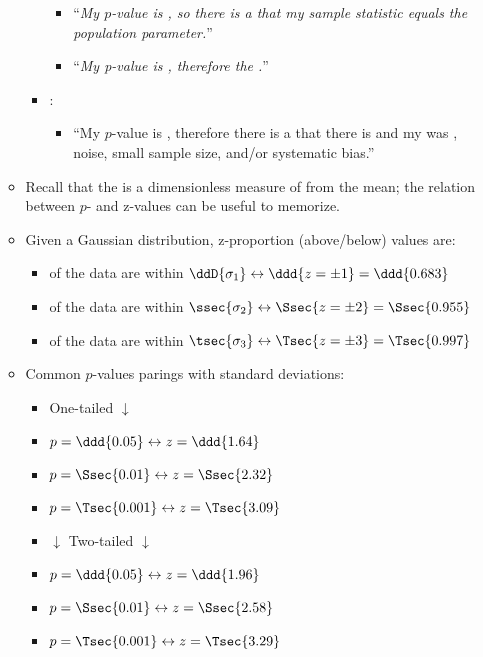 \begin{itemize}
\begin{itemize}
\begin{itemize}
\begin{itemize}
            \item ``\textit{My \(p\)-value is , so there is a  that my sample statistic equals the population parameter.}''
            \item ``\textit{My p-value is , therefore the .}''
          \end{itemize}
        \item {}: 
        \begin{itemize}
          \item ``My \(p\)-value is , therefore there is a  that there is  and my  was , noise, small sample size, and/or systematic bias.''
        \end{itemize}
      \end{itemize}
    \item Recall that the \hyperref[Subsection: Z-Score Standardization]{} is a dimensionless measure of \hyperref[Subsection: Measures of Dispersion]{} from the mean; the relation between \(p\)- and z-values can be useful to memorize.
    \item Given a Gaussian distribution, z-proportion (above/below) values are:
      \begin{itemize}
        \item {} of the data are within \(\ddD{\sigma_1}\leftrightarrow \ddd{z = \pm 1}= \ddd{0.683}\) 
        \item {} of the data are within \(\ssec{\sigma_2}\leftrightarrow \Ssec{z = \pm 2} = \Ssec{0.955}\)
        \item {} of the data are within \(\tsec{\sigma_3}\leftrightarrow \Tsec{z = \pm 3} = \Tsec{0.997}\)
      \end{itemize}
    \item Common \(p\)-values parings with standard deviations:
    \vspace{-6pt}
    \begin{multicols}{2}
      \begin{itemize}
        \item One-tailed \(\downarrow\)
        \item \(p=\ddd{0.05} \leftrightarrow z = \ddd{1.64}\)
        \item \(p=\Ssec{0.01} \leftrightarrow z = \Ssec{2.32}\)
        \item \(p=\Tsec{0.001} \leftrightarrow z = \Tsec{3.09}\)
        \item \(\downarrow\) Two-tailed \(\downarrow\)
        \item \(p=\ddd{0.05} \leftrightarrow z = \ddd{1.96}\)
        \item \(p=\Ssec{0.01} \leftrightarrow z = \Ssec{2.58}\)
        \item \(p=\Tsec{0.001} \leftrightarrow z = \Tsec{3.29}\)
      \end{itemize}
    \end{multicols}
  \end{itemize}
  

\end{itemize}
